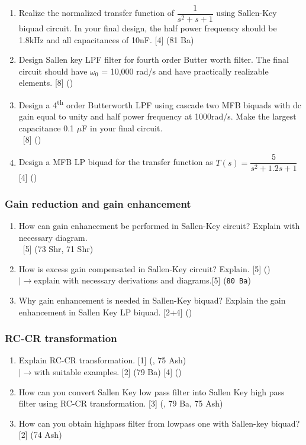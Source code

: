 \documentclass[12pt]{article}
\newcommand{\w}{\(\omega\)}
\newcommand{\lb}{\\$\left|\rightarrow\right.$}
\newcommand{\enter}{\\\textcolor{white}{1}}
\newcommand{\super}[1]{\textsuperscript{#1}}
\begin{document}
\begin{enumerate}
				\item Realize the normalized transfer function of $\dfrac{1}{s^2+s+1}$ using Sallen-Key biquad circuit. In your final design, the half power frequency should be 1.8kHz and all capacitances of 10nF. \hfill [4] (81 Ba)

				\item Design Sallen key LPF filter for fourth order Butter worth filter. The final circuit should have \w$_0$ = 10,000 rad/s and have practically realizable elements. \hfill [8] ()				

				\item Design a 4\super{th} order Butterworth LPF using cascade two MFB biquads with dc gain equal to unity and half power frequency at 1000rad/s. Make the largest capacitance 0.1 $\mu$F in your final circuit.
				\enter\hfill [8] ()
				
				\item Design a MFB LP biquad for the transfer function as $T(s) = \dfrac{5}{s^2+1.2s+1}$ \hfill [4] ()
			\end{enumerate}

		\subsubsection{Gain reduction and gain enhancement}
			\begin{enumerate}
				\item How can gain enhancement be performed in Sallen-Key circuit? Explain with necessary diagram.
				\enter\hfill [5] (73 Shr, 71 Shr)
				
				\item How is excess gain compensated in Sallen-Key circuit? Explain. \hfill [5] ()
				\lb explain with necessary derivations and diagrams.\hfill [5] (\texttt{80 Ba})
				
				\item Why gain enhancement is needed in Sallen-Key biquad? Explain the gain enhancement in Sallen Key LP biquad. \hfill [2+4] ()
			\end{enumerate}
			
		\subsubsection{RC-CR transformation}
			\begin{enumerate}[topsep=0pt]
				\item Explain RC-CR transformation. \hfill [1] (, 75 Ash)
				\lb with suitable examples. \hfill [2] (79 Ba) [4] ()

				\item How can you convert Sallen Key low pass filter into Sallen Key high pass filter using RC-CR transformation. \hspace{11cm} [3] (, 79 Ba, 75 Ash)

				\item How can you obtain highpass filter from lowpass one with Sallen-key biquad? \hfill [2] (74 Ash)
			\end{enumerate}
\end{document}
